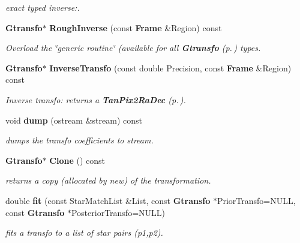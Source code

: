 \begin{CompactItemize}
\begin{CompactList}\small\item\em exact typed inverse:.\item\end{CompactList}\item 
{}
{\bf Gtransfo}$\ast$ {\bf Rough\-Inverse} (const {\bf Frame} \&Region) const\label{class_tanradec2pix_a6}

\begin{CompactList}\small\item\em Overload the \char`\"{}generic routine\char`\"{} (available for all {\bf Gtransfo} {\rm (p.\,\pageref{class_gtransfo})} types.\item\end{CompactList}\item 
{}
{\bf Gtransfo}$\ast$ {\bf Inverse\-Transfo} (const double Precision, const {\bf Frame} \&Region) const\label{class_tanradec2pix_a7}

\begin{CompactList}\small\item\em Inverse transfo: returns a {\bf Tan\-Pix2Ra\-Dec} {\rm (p.\,\pageref{class_tanpix2radec})}.\item\end{CompactList}\item 
{}
void {\bf dump} (ostream \&stream) const\label{class_tanradec2pix_a8}

\begin{CompactList}\small\item\em dumps the transfo coefficients to stream.\item\end{CompactList}\item 
{}
{\bf Gtransfo}$\ast$ {\bf Clone} () const\label{class_tanradec2pix_a9}

\begin{CompactList}\small\item\em returns a copy (allocated by new) of the transformation.\item\end{CompactList}\item 
double {\bf fit} (const Star\-Match\-List \&List, const {\bf Gtransfo} $\ast$Prior\-Transfo=NULL, const {\bf Gtransfo} $\ast$Posterior\-Transfo=NULL)
\begin{CompactList}\small\item\em fits a transfo to a list of star pairs (p1,p2).\item\end{CompactList}\end{CompactItemize}



